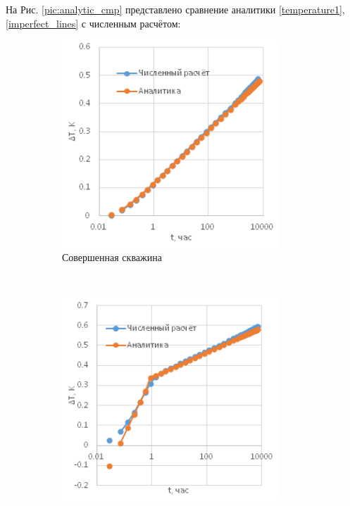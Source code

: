 	На Рис. \ref{pic:analytic_cmp} представлено сравнение аналитики \eqref{temperature1}, \eqref{imperfect_lines} с численным расчётом:
	
\begin{figure}[H]

	\begin{subfigure}[b]{0.5\textwidth}
		\centering
		\includegraphics[width=0.9\textwidth]{pic/perfect.png}
		\caption{Совершенная скважина}
		\label{pic:perf}
	\end{subfigure}
~
	\begin{subfigure}[b]{0.5\textwidth}
		\centering
		\includegraphics[width=0.9\textwidth]{pic/imperf1.png}

\end{subfigure}
\end{figure}
